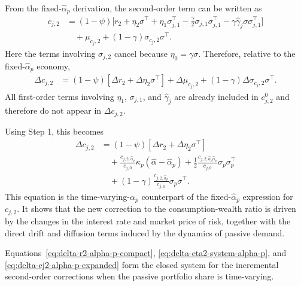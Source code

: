 From the fixed-$\hat{\alpha}_p$ derivation, the second-order term can be written as
\begin{align}
    c_{j,2} &= (1-\psi)\Big[
        r_2
        + \eta_2\sigma^\top
        + \eta_1\sigma_{j,1}^\top
        - \frac{\gamma}{2}\sigma_{j,1}\sigma_{j,1}^\top
        - \gamma\hat{\gamma}_j\sigma\sigma_{j,1}^\top
    \Big] \nonumber\\
    &\quad + \mu_{c_j,2}
    + (1-\gamma)\sigma_{c_j,2}\sigma^\top.
\end{align}
Here the terms involving $\sigma_{j,2}$ cancel because $\eta_0=\gamma\sigma$.
Therefore, relative to the fixed-$\hat{\alpha}_p$ economy,
\begin{align}\label{eq:delta-cj2-alpha-p}
    \Delta c_{j,2}
    &= (1-\psi)\left[\Delta r_2+\Delta\eta_2\sigma^\top\right]
    +\Delta\mu_{c_j,2}
    +(1-\gamma)\Delta\sigma_{c_j,2}\sigma^\top.
\end{align}
All first-order terms involving $\eta_1$, $\sigma_{j,1}$, and $\hat{\gamma}_j$ are already included in $c_{j,2}^{0}$ and therefore do not appear in $\Delta c_{j,2}$.

Using Step 1, this becomes
\begin{align}\label{eq:delta-cj2-alpha-p-expanded}
    \Delta c_{j,2}
    &= (1-\psi)\left[\Delta r_2+\Delta\eta_2\sigma^\top\right] \nonumber\\
    &\quad +\frac{c_{j,2,\hat{\alpha}_p}}{c_{j,0}}\kappa_p(\hat{\alpha}-\hat{\alpha}_p)
    +\frac{1}{2}\frac{c_{j,2,\hat{\alpha}_p\hat{\alpha}_p}}{c_{j,0}}\sigma_p\sigma_p^\top 
\nonumber\\
    &\quad +(1-\gamma)\frac{c_{j,2,\hat{\alpha}_p}}{c_{j,0}}\sigma_p\sigma^\top.
\end{align}
This equation is the time-varying-$\alpha_p$ counterpart of the fixed-$\hat{\alpha}_p$ expression for $c_{j,2}$.
It shows that the new correction to the consumption-wealth ratio is driven by the changes in the interest rate and market price of risk, together with the direct drift and diffusion terms induced by the dynamics of passive demand.

Equations~\eqref{eq:delta-r2-alpha-p-compact}, \eqref{eq:delta-eta2-system-alpha-p}, and \eqref{eq:delta-cj2-alpha-p-expanded} form the closed system for the incremental second-order corrections when the passive portfolio share is time-varying.

